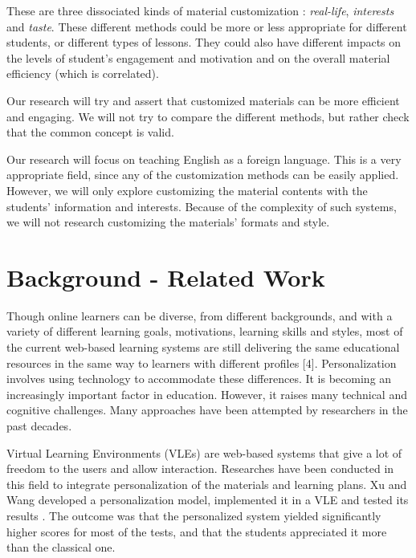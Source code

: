 \documentclass[a4paper,12pt]{article}
\begin{document}
These are three dissociated kinds of material customization : \textit{real-life}, \textit{interests} and \textit{taste}. These different methods could be more or less appropriate for different students, or different types of lessons. They could also have different impacts on the levels of student’s engagement and motivation and on the overall material efficiency (which is correlated).

Our research will try and assert that customized materials can be more efficient and engaging. We will not try to compare the different methods, but rather check that the common concept is valid.

Our research will focus on teaching English as a foreign language. This is a very appropriate field, since any of the customization methods can be easily applied. However, we will only explore customizing the material contents with the students' information and interests. Because of the complexity of such systems, we will not research customizing the materials' formats and style.


\section{Background - Related Work}

Though online learners can be diverse, from different backgrounds, and with a variety of different learning goals, motivations, learning skills and styles, most of the current web-based learning systems are still delivering the same educational resources in the same way to learners with different profiles [4]. Personalization involves using technology to accommodate these differences. It is becoming an increasingly important factor in education. However, it raises many technical and cognitive challenges. Many approaches have been attempted by researchers in the past decades.

Virtual Learning Environments (VLEs) are web-based systems that give a lot of freedom to the users and allow interaction. Researches have been conducted in this field to integrate personalization of the materials and learning plans. Xu and Wang developed a personalization model, implemented it in a VLE and tested its results \cite{xu_vle}. The outcome was that the personalized system yielded significantly higher scores for most of the tests, and that the students appreciated it more than the classical one.
\end{document}
